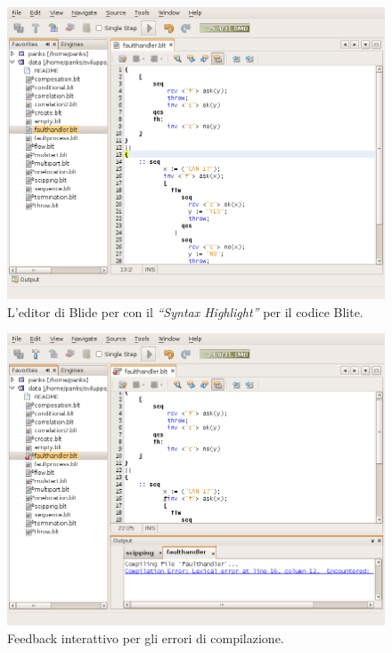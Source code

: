 \begin{figure}[t]
\begin{center}
\includegraphics[scale=0.60]
{blide/dia/BlideEditor}
\caption[Blide, l'editor per Blite]{L'editor di Blide per con il \emph{``Syntax
Highlight''} per il codice Blite.}
  \label{fig:blideEditor}
\end{center}
\end{figure}

\begin{figure}[b!]
\begin{center}
\includegraphics[scale=0.60]
{blide/dia/BlideCompError}
\caption[Blide, feedback alla compilazione]{Feedback interattivo per gli errori
di compilazione.}
  \label{fig:blideCompError}
\end{center}
\end{figure}

